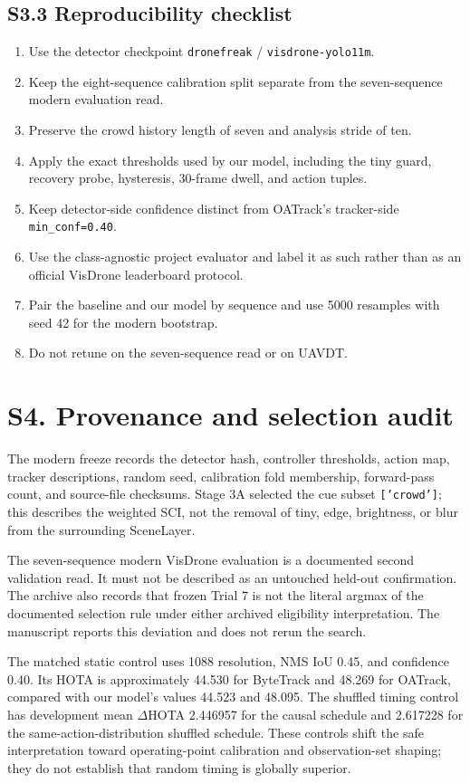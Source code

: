 \documentclass[11pt]{article}
\begin{document}
\subsection*{S3.3 Reproducibility checklist}
\begin{enumerate}[leftmargin=*]
\item Use the detector checkpoint \texttt{dronefreak} / \texttt{visdrone-yolo11m}.
\item Keep the eight-sequence calibration split separate from the seven-sequence
      modern evaluation read.
\item Preserve the crowd history length of seven and analysis stride of ten.
\item Apply the exact thresholds used by our model, including the tiny guard, recovery probe, hysteresis,
      30-frame dwell, and action tuples.
\item Keep detector-side confidence distinct from OATrack's tracker-side
      \texttt{min\_conf=0.40}.
\item Use the class-agnostic project evaluator and label it as such rather than
      as an official VisDrone leaderboard protocol.
\item Pair the baseline and our model by sequence and use 5000 resamples with seed 42 for
      the modern bootstrap.
\item Do not retune on the seven-sequence read or on UAVDT.
\end{enumerate}

\section*{S4. Provenance and selection audit}

The modern freeze records the detector hash, controller thresholds, action map,
tracker descriptions, random seed, calibration fold membership, forward-pass
count, and source-file checksums. Stage 3A selected the cue subset
\texttt{['crowd']}; this describes the weighted SCI, not the removal of tiny,
edge, brightness, or blur from the surrounding SceneLayer.

The seven-sequence modern VisDrone evaluation is a documented second validation
read. It must not be described as an untouched held-out confirmation. The
archive also records that frozen Trial 7 is not the literal argmax of the
documented selection rule under either archived eligibility interpretation. The
manuscript reports this deviation and does not rerun the search.

The matched static control uses 1088 resolution, NMS IoU 0.45, and confidence
0.40. Its HOTA is approximately 44.530 for ByteTrack and 48.269 for OATrack,
compared with our model's values 44.523 and 48.095. The shuffled timing control has
development mean $\Delta$HOTA 2.446957 for the causal schedule and 2.617228 for
the same-action-distribution shuffled schedule. These controls shift the safe
interpretation toward operating-point calibration and observation-set shaping;
they do not establish that random timing is globally superior.
\end{document}
